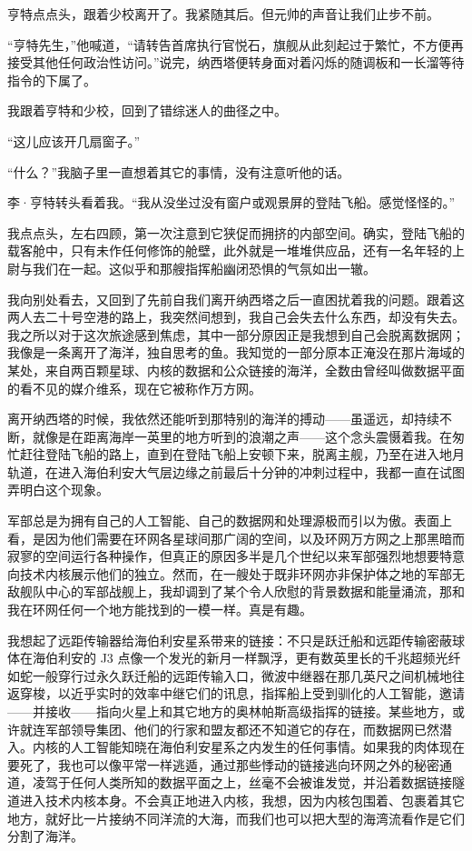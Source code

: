 \documentclass[AutoFakeBold=true]{book}
\begin{document}
亨特点点头，跟着少校离开了。我紧随其后。但元帅的声音让我们止步不前。

``亨特先生，''他喊道，``请转告首席执行官悦石，旗舰从此刻起过于繁忙，不方便再接受其他任何政治性访问。''说完，纳西塔便转身面对着闪烁的随调板和一长溜等待指令的下属了。

我跟着亨特和少校，回到了错综迷人的曲径之中。

\vspace*{1em}

``这儿应该开几扇窗子。''

``什么？''我脑子里一直想着其它的事情，没有注意听他的话。

李·亨特转头看着我。``我从没坐过没有窗户或观景屏的登陆飞船。感觉怪怪的。''

我点点头，左右四顾，第一次注意到它狭促而拥挤的内部空间。确实，登陆飞船的载客舱中，只有未作任何修饰的舱壁，此外就是一堆堆供应品，还有一名年轻的上尉与我们在一起。这似乎和那艘指挥船幽闭恐惧的气氛如出一辙。

我向别处看去，又回到了先前自我们离开纳西塔之后一直困扰着我的问题。跟着这两人去二十号空港的路上，我突然间想到，我自己会失去什么东西，却没有失去。我之所以对于这次旅途感到焦虑，其中一部分原因正是我想到自己会脱离数据网；我像是一条离开了海洋，独自思考的鱼。我{\kaishu 知觉}的一部分原本正淹没在那片海域的某处，来自两百颗星球、内核的数据和公众链接的海洋，全数由曾经叫做数据平面的看不见的媒介维系，现在它被称作万方网。

离开纳西塔的时候，我依然还能听到那特别的海洋的搏动——虽遥远，却持续不断，就像是在距离海岸一英里的地方听到的浪潮之声——这个念头震慑着我。在匆忙赶往登陆飞船的路上，直到在登陆飞船上安顿下来，脱离主舰，乃至在进入地月轨道，在进入海伯利安大气层边缘之前最后十分钟的冲刺过程中，我都一直在试图弄明白这个现象。

军部总是为拥有自己的人工智能、自己的数据网和处理源极而引以为傲。表面上看，是因为他们需要在环网各星球间那广阔的空间，以及环网万方网之上那黑暗而寂寥的空间运行各种操作，但真正的原因多半是几个世纪以来军部强烈地想要特意向技术内核展示他们的独立。然而，在一艘处于既非环网亦非保护体之地的军部无敌舰队中心的军部战舰上，我却调到了某个令人欣慰的背景数据和能量涌流，那和我在环网任何一个地方能找到的一模一样。真是有趣。

我想起了远距传输器给海伯利安星系带来的链接：不只是跃迁船和远距传输密蔽球体在海伯利安的 J3 点像一个发光的新月一样飘浮，更有数英里长的千兆超频光纤如蛇一般穿行过永久跃迁船的远距传输入口，微波中继器在那几英尺之间机械地往返穿梭，以近乎实时的效率中继它们的讯息，指挥船上受到驯化的人工智能，邀请——并接收——指向火星上和其它地方的奥林帕斯高级指挥的链接。某些地方，或许就连军部领导集团、他们的行家和盟友都还不知道它的存在，而数据网已然潜入。内核的人工智能知晓在海伯利安星系之内发生的任何事情。如果我的肉体现在要死了，我也可以像平常一样逃遁，通过那些悸动的链接逃向环网之外的秘密通道，凌驾于任何人类所知的数据平面之上，丝毫不会被谁发觉，并沿着数据链接隧道进入技术内核本身。{\kaishu 不会真正地进入内核，}我想，{\kaishu 因为内核包围着、包裹着其它地方，就好比一片接纳不同洋流的大海，而我们也可以把大型的海湾流看作是它们分割了海洋。}
\end{document}
